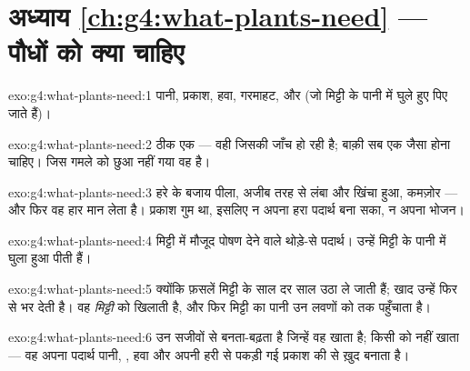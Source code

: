 \section*{अध्याय \ref{ch:g4:what-plants-need} --- पौधों को क्या चाहिए}

\begin{solution}{exo:g4:what-plants-need:1}
पानी, प्रकाश, हवा, गरमाहट, और  (जो मिट्टी के पानी में घुले हुए
पिए जाते हैं)।
\end{solution}

\begin{solution}{exo:g4:what-plants-need:2}
ठीक एक --- वही जिसकी जाँच हो रही है; बाक़ी सब एक जैसा होना चाहिए। जिस
गमले को छुआ नहीं गया वह  है।
\end{solution}

\begin{solution}{exo:g4:what-plants-need:3}
हरे के बजाय पीला, अजीब तरह से लंबा और खिंचा हुआ, कमज़ोर --- और फिर वह
हार मान लेता है। प्रकाश गुम था, इसलिए  न अपना हरा पदार्थ बना सका,
न अपना भोजन।
\end{solution}

\begin{solution}{exo:g4:what-plants-need:4}
मिट्टी में मौजूद पोषण देने वाले थोड़े-से पदार्थ।  उन्हें मिट्टी के
पानी में घुला हुआ पीती हैं।
\end{solution}

\begin{solution}{exo:g4:what-plants-need:5}
क्योंकि फ़सलें मिट्टी के  साल दर साल उठा ले जाती हैं; खाद
उन्हें फिर से भर देती है। वह \emph{मिट्टी} को खिलाती है, और फिर
मिट्टी का पानी उन लवणों को  तक पहुँचाता है।
\end{solution}

\begin{solution}{exo:g4:what-plants-need:6}
 उन सजीवों से बनता-बढ़ता है जिन्हें वह खाता है;  किसी को नहीं
खाता --- वह अपना पदार्थ पानी, , हवा और अपनी हरी  से
पकड़ी गई प्रकाश की  से ख़ुद बनाता है।
\end{solution}

